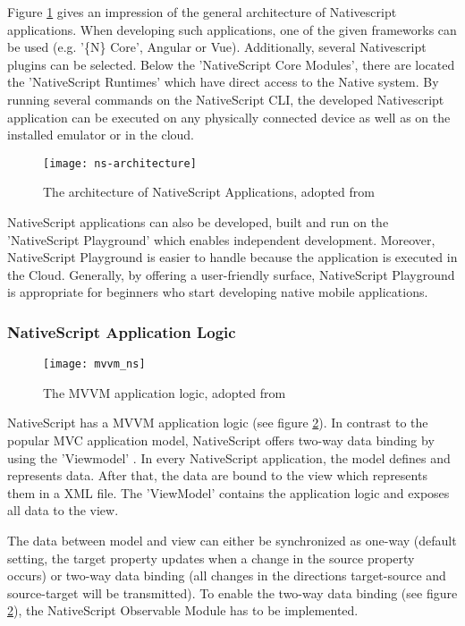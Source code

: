 Figure \ref{fig:nsarchitecture} gives an impression of the general architecture of Nativescript applications. When developing such applications, one of the given frameworks can be used (e.g. '\{N\} Core', Angular or Vue). Additionally, several Nativescript plugins can be selected. Below the 'NativeScript Core Modules', there are located the 'NativeScript Runtimes' which have direct access to the Native system. By running several commands on the NativeScript \ac{CLI}, the developed Nativescript application can be executed on any physically connected device as well as on the installed emulator or in the cloud. 

\begin{figure}
\centering
\texttt{[image: ns-architecture]} 
\caption{\label{fig:nsarchitecture}The architecture of NativeScript Applications, adopted from \cite{nsarchitecture}} 
\end{figure}

NativeScript applications can also be developed, built and run on the 'NativeScript Playground' \cite{nsplayground} which enables independent development. Moreover, NativeScript Playground is easier to handle because the application is executed in the Cloud. Generally, by offering a user-friendly surface, NativeScript Playground is appropriate for beginners who start developing native mobile applications.

\subsubsection{NativeScript Application Logic}

\begin{figure}
\centering
\texttt{[image: mvvm\_ns]} 
\caption{\label{fig:mvvm}The MVVM application logic, adopted from \cite{nativescript}} 
\end{figure}

NativeScript has a \ac{MVVM} application logic (see figure \ref{fig:mvvm}). In contrast to the popular \ac{MVC} application model, NativeScript offers two-way data binding by using the 'Viewmodel' \cite{nativescript}. In every NativeScript application, the model defines and represents data. After that, the data are bound to the view which represents them in a XML file. The 'ViewModel' contains the application logic and exposes all data to the view. 

The data between model and view can either be synchronized as one-way (default setting, the target property updates when a change in the source property occurs) or two-way data binding (all changes in the directions target-source and source-target will be transmitted). To enable the two-way data binding (see figure \ref{fig:mvvm}), the NativeScript Observable Module has to be implemented. 

